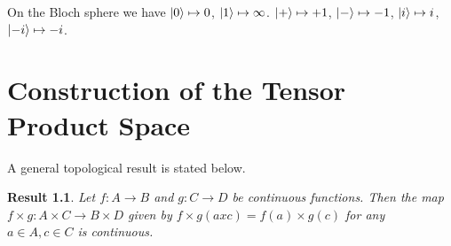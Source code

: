 \documentclass[12pt,twoside,fleqn]{report}
\theoremstyle{thmstyle}
\newtheorem{result}{Result}[chapter]
\begin{document}
On the Bloch sphere we have $\ket{0} \mapsto 0$, $\ket{1} \mapsto \infty$. $\ket{+} \mapsto  +1$, $\ket{-} \mapsto -1$, $\ket{i} \mapsto i$, $\ket{-i} \mapsto -i$.




\chapter{Construction of the Tensor Product Space}
\label{tensor}

A general topological result is stated below.
\begin{result}
    \label{product:continuous}
    Let $f: A \to B$ and $g: C \to D$ be continuous functions.
    Then the map $f \times g: A \times C \to B \times D$ given by $f \times g (a x c) = f(a) \times g(c)$ for any $a \in A, c \in C$ is continuous.
\end{result}
\end{document}
